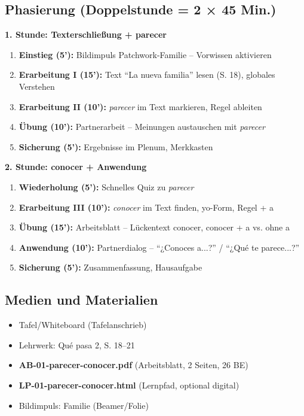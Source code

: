 \documentclass[11pt,a4paper]{article}
\newcommand{\lehrwerk}{Qué pasa 2}
\newcommand{\lehrwerkseite}{S. 18--21}
\begin{document}
\subsection{Phasierung (Doppelstunde = 2 × 45 Min.)}

\textbf{1. Stunde: Texterschließung + parecer}
\begin{enumerate}
    \item \textbf{Einstieg (5'):} Bildimpuls Patchwork-Familie -- Vorwissen aktivieren
    \item \textbf{Erarbeitung I (15'):} Text ``La nueva familia'' lesen (S. 18), globales Verstehen
    \item \textbf{Erarbeitung II (10'):} \textit{parecer} im Text markieren, Regel ableiten
    \item \textbf{Übung (10'):} Partnerarbeit -- Meinungen austauschen mit \textit{parecer}
    \item \textbf{Sicherung (5'):} Ergebnisse im Plenum, Merkkasten
\end{enumerate}

\textbf{2. Stunde: conocer + Anwendung}
\begin{enumerate}
    \item \textbf{Wiederholung (5'):} Schnelles Quiz zu \textit{parecer}
    \item \textbf{Erarbeitung III (10'):} \textit{conocer} im Text finden, yo-Form, Regel + a
    \item \textbf{Übung (15'):} Arbeitsblatt -- Lückentext conocer, conocer + a vs. ohne a
    \item \textbf{Anwendung (10'):} Partnerdialog -- ``¿Conoces a...?'' / ``¿Qué te parece...?''
    \item \textbf{Sicherung (5'):} Zusammenfassung, Hausaufgabe
\end{enumerate}

\subsection{Medien und Materialien}
\begin{itemize}
    \item Tafel/Whiteboard (Tafelanschrieb)
    \item Lehrwerk: \lehrwerk, \lehrwerkseite
    \item \textbf{AB-01-parecer-conocer.pdf} (Arbeitsblatt, 2 Seiten, 26 BE)
    \item \textbf{LP-01-parecer-conocer.html} (Lernpfad, optional digital)
    \item Bildimpuls: Familie (Beamer/Folie)
\end{itemize}
\end{document}
